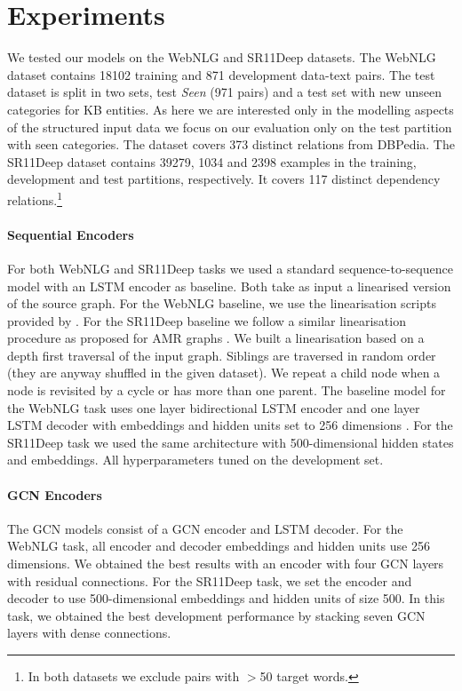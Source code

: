 \documentclass[11pt,a4paper,dvipsnames]{article}
\begin{document}
\section{Experiments}
\label{sec:evalsetup}

We tested our models on the WebNLG and SR11Deep datasets.
The WebNLG dataset contains 18102 training and 871 development 
data-text pairs. 
The test dataset is split in two sets, test \textit{Seen} (971 pairs)
and a test set with new unseen categories for KB entities.
As here we are interested only in the modelling aspects of the 
structured input data we focus on our evaluation only on the 
test partition with seen categories.
The dataset covers 373 distinct relations from DBPedia. 
The SR11Deep dataset contains 39279, 1034 and 2398 examples in 
the training, development and test partitions, respectively.
It covers 117 distinct dependency relations.\footnote{
In both datasets we exclude pairs with $>$50 target words.}

\paragraph{Sequential Encoders}
For both WebNLG and SR11Deep tasks we used a standard sequence-to-sequence model \cite{bahdanau2015neural,luong2015effective} with an LSTM encoder as baseline.
Both take as input a linearised version of the source graph.
For the WebNLG baseline, we use the linearisation scripts provided by 
\cite{gardent-EtAl:2017:INLG2017}. 
For the SR11Deep baseline we follow a similar linearisation procedure
as proposed for AMR graphs \cite{konstas2017neural}.
We built a linearisation based on a depth first traversal of the input graph. 
Siblings are traversed in random order (they are anyway shuffled in the given 
dataset). 
We repeat a child node when a node is revisited by a cycle
or has more than one parent.
The baseline model for the WebNLG task uses one layer bidirectional LSTM encoder and one layer LSTM decoder with embeddings and hidden units set to 256 dimensions . 
For the SR11Deep task we used the same architecture with 500-dimensional hidden states and embeddings.
All hyperparameters tuned on the development set.
 

\paragraph{GCN Encoders}
The GCN models consist of a GCN encoder and LSTM decoder.
For the WebNLG task, all encoder and decoder embeddings and hidden units
use 256 dimensions. 
We obtained the best results with an encoder with four GCN layers with residual connections.
For the SR11Deep task, we set the encoder and decoder to use 500-dimensional 
embeddings and hidden units of size 500. In this task, we obtained 
the best development performance by stacking seven GCN layers with dense connections.
\end{document}
